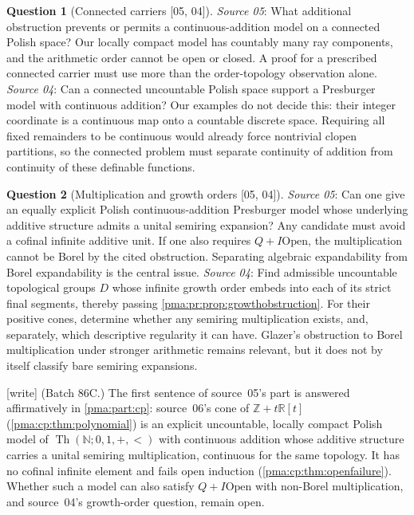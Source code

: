 \documentclass[11pt]{article}
\numberwithin{equation}{section}
\theoremstyle{definition}
\newtheorem{question}[question]{Question}
\theoremstyle{remark}
\newcommand{\N}{\mathbb N}
\newcommand{\Z}{\mathbb Z}
\newcommand{\R}{\mathbb R}
\newcommand{\Th}{\operatorname{Th}}
\newcommand{\src}[1]{\textup{\textsf{\small[#1]}}}
\newcommand{\writetag}{\textup{\textsf{\small[write]}}}
\begin{document}
\begin{question}[Connected carriers \src{05, 04}]\label{pma:pr:q:connected}
\emph{Source 05}: What additional obstruction prevents or permits a
continuous-addition model on a connected Polish space? Our locally compact
model has countably many ray components, and the arithmetic order cannot be
open or closed. A proof for a prescribed connected carrier must use more than
the order-topology observation alone.
\emph{Source 04}: Can a connected uncountable Polish space support a
Presburger model with continuous addition? Our examples do not decide this:
their integer coordinate is a continuous map onto a countable discrete space.
Requiring all fixed remainders to be continuous would already force
nontrivial clopen partitions, so the connected problem must separate
continuity of addition from continuity of these definable functions.
\end{question}

\begin{question}[Multiplication and growth orders \src{05, 04}]\label{pma:pr:q:multiplication}
\emph{Source 05}: Can one give an equally explicit Polish continuous-addition
Presburger model whose underlying additive structure admits a unital semiring
expansion? Any candidate must avoid a cofinal infinite additive unit. If one
also requires $Q+I\mathrm{Open}$, the multiplication cannot be Borel by the
cited obstruction. Separating algebraic expandability from Borel
expandability is the central issue.
\emph{Source 04}: Find admissible uncountable topological groups $D$ whose
infinite growth order embeds into each of its strict final segments, thereby
passing \cref{pma:pr:prop:growthobstruction}. For their positive cones,
determine whether any semiring multiplication exists, and, separately, which
descriptive regularity it can have. Glazer's obstruction to Borel
multiplication under stronger arithmetic remains relevant, but it does not by
itself classify bare semiring expansions.
\end{question}

\noindent\writetag{} (Batch 86C.) The first sentence of source~05's part is
answered affirmatively in \cref{pma:part:cp}: source~06's cone of
$\Z+t\R[t]$ (\cref{pma:cp:thm:polynomial}) is an explicit uncountable,
locally compact Polish model of $\Th(\N;0,1,+,<)$ with continuous addition
whose additive structure carries a unital semiring multiplication, continuous
for the same topology. It has no cofinal infinite element and fails open
induction (\cref{pma:cp:thm:openfailure}). Whether such a model can also
satisfy $Q+I\mathrm{Open}$ with non-Borel multiplication, and source~04's
growth-order question, remain open.
\end{document}
